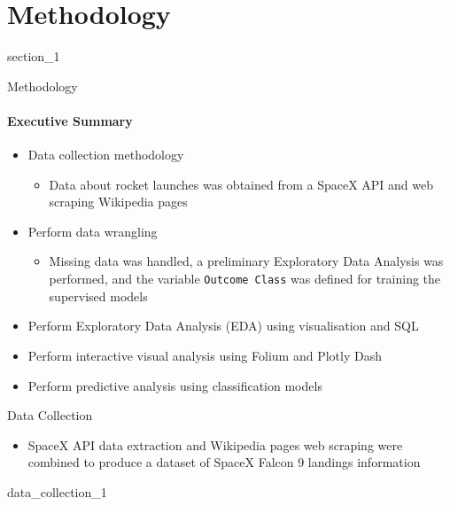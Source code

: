 \section{Methodology}

{
{section_1}
\begin{frame}[plain]
\end{frame}
}

\begin{frame}{Methodology}
    \framesubtitle{Executive Summary}
    \begin{itemize}
        \item Data collection methodology
        \begin{itemize}
            \item Data about rocket launches was obtained from a SpaceX API and web scraping Wikipedia pages
        \end{itemize}
        \item Perform data wrangling
        \begin{itemize}
            \item Missing data was handled, a preliminary Exploratory Data Analysis was performed, and the variable \texttt{Outcome Class} was defined for training the supervised models
        \end{itemize}
        \item Perform Exploratory Data Analysis (EDA) using visualisation and SQL
        \item Perform interactive visual analysis using Folium and Plotly Dash
        \item Perform predictive analysis using classification models
    \end{itemize}
\end{frame}

\begin{frame}{Data Collection}
    \begin{itemize}
        \item SpaceX API data extraction and Wikipedia pages web scraping were combined to produce a dataset of SpaceX Falcon 9 landings information
    \end{itemize}
    {data_collection_1}
\end{frame}

